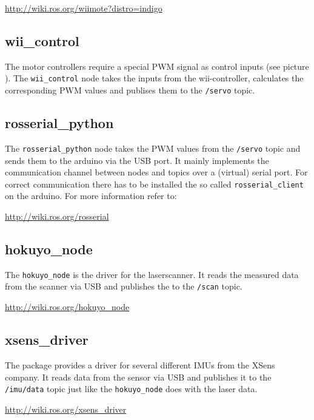 \hyperref[http://wiki.ros.org/wiimote?distro=indigo]{http://wiki.ros.org/wiimote?distro=indigo}

\subsection{wii\_control}
\label{sec:tas_package_drivers_wii_control}
The motor controllers require a special PWM signal as control inputs (see picture ). The \texttt{wii\_control} node takes the inputs from the wii-controller, calculates the corresponding PWM values and publises them to the \texttt{/servo} topic.


\subsection{rosserial\_python}
\label{sec:tas_package_drivers_rosserial}
The \texttt{rosserial\_python} node takes the PWM values from the \texttt{/servo} topic and sends them to the arduino via the USB port. It mainly implements the communication channel between nodes and topics over a (virtual) serial port. For correct communication there has to be installed the so called \texttt{rosserial\_client} on the arduino. For more information refer to:

\hyperref[http://wiki.ros.org/rosserial]{http://wiki.ros.org/rosserial}

\subsection{hokuyo\_node}
\label{sec:tas_package_drivers_hokuyo}
The \texttt{hokuyo\_node} is the driver for the laserscanner. It reads the measured data from the scanner via USB and publishes the to the \texttt{/scan} topic.

\hyperref[http://wiki.ros.org/hokuyo_node]{http://wiki.ros.org/hokuyo\_node}

\subsection{xsens\_driver}
\label{sec:tas_package_drivers_xsens}

The package provides a driver for several different IMUs from the XSens company. It reads data from the sensor via USB and publishes it to the \texttt{/imu/data} topic just like the \texttt{hokuyo\_node} does with the laser data.

\hyperref[http://wiki.ros.org/xsens_driver]{http://wiki.ros.org/xsens\_driver}

